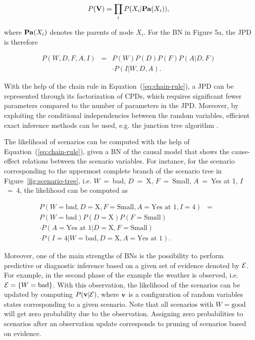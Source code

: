\documentclass[conference]{IEEEtran}
\begin{document}
\begin{eqnarray}
P(\VV) = \prod_i P(X_i|\Pa(X_i)),  \label{eq:chain-rule}
\end{eqnarray}

\noindent
where ${\mathbf{Pa}}(X_i)$ denotes the parents of node $X_i$. For the BN in Figure 5a, the JPD is therefore

\begin{eqnarray}
 P(W,D,F,A,I) &=& P(W)P(D)P(F)P(A|D,F) \nonumber \\
  & & \cdot P(I|W,D,A). \nonumber
\end{eqnarray}


With the help of the chain rule in Equation~(\ref{eq:chain-rule}), a JPD can be represented through its factorization of CPDs, which requires significant fewer parameters compared to the number of parameters in the JPD. Moreover, by exploiting the conditional independencies between the random variables, efficient exact inference methods can be used, e.g. the junction tree algorithm \cite{cowell99bn}.

The likelihood of scenarios can be computed with the help of Equation~(\ref{eq:chain-rule}), given a BN of the causal model that shows the cause-effect relations between the scenario variables. For instance, for the scenario corresponding to the uppermost complete branch of the scenario tree in Figure~\ref{fig:scenario-tree}, i.e. $W$~=~bad, $D$~=~X, $F$~=~Small, $A$~=~Yes at 1, $I$~=~4, the likelihood can be computed as

\begin{eqnarray}
 P(W=\text{bad}, D=\text{X}, F=\text{Small}, A=\text{Yes at 1}, I=\text{4}) &=& \nonumber \\
 P(W=\text{bad})P(D=\text{X})P(F=\text{Small}) & & \nonumber \\ 
 \cdot P(A=\text{Yes at 1}|D=\text{X},F=\text{Small}) \nonumber \\
 \cdot P(I=\text{4}|W=\text{bad},D=\text{X},A=\text{Yes at 1}). \nonumber
\end{eqnarray}

  
Moreover, one of the main strengths of BNs is the possibility to perform predictive or diagnostic inference based on a given set of evidence denoted by ${\mathcal{E}}$. For example, in the second phase of the example the weather is observed, i.e. ${\mathcal{E}} = \{W = \text{bad}\}$. With this observation, the likelihood of the scenarios can be updated by computing $P({\mathbf{v}}|{\mathcal{E}})$, where ${\mathbf{v}}$ is a configuration of random variables states corresponding to a given scenario. Note that all scenarios with $W = \text{good}$ will get zero probability due to the observation. Assigning zero probabilities to scenarios after an observation update corresponds to pruning of scenarios based on evidence.
\end{document}
